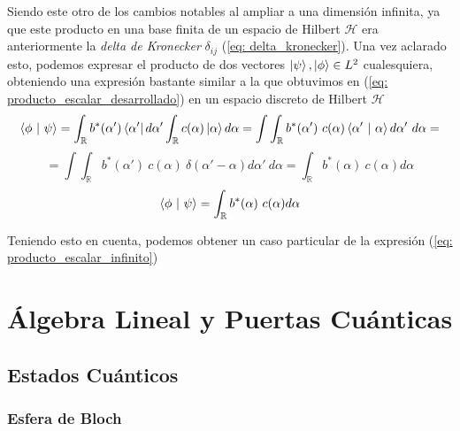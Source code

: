 \documentclass{article}
\numberwithin{equation}{section} %
\begin{document}
    \vspace{2.5mm}

    Siendo este otro de los cambios notables al ampliar a una dimensión infinita, ya que este producto en una base finita de un espacio de Hilbert \( \mathcal{H} \) era anteriormente la \textit{delta de Kronecker} \( \delta_{ij} \) (\ref{eq: delta_kronecker}). Una vez aclarado esto, podemos expresar el producto de dos vectores \( \ket{\psi}, \ket{\phi} \in L^{2} \) cualesquiera, obteniendo una expresión bastante similar a la que obtuvimos en (\ref{eq: producto_escalar_desarrollado}) en un espacio discreto de Hilbert \( \mathcal{H} \)
    \begin{equation*}
        \braket{\phi \ | \ \psi} = \int_{\mathbb{R}} b^{*} (\alpha') \bra{\alpha'} d \alpha' \int_{\mathbb{R}} c (\alpha) \ket{\alpha} d \alpha = \int\int_{\mathbb{R}} b^{*} (\alpha') \ c (\alpha) \braket{\alpha' \ | \ \alpha} d \alpha' \ d \alpha =
    \end{equation*}
    \begin{equation*}
        = \int\int_{\mathbb{R}} b^{*} (\alpha') \ c (\alpha) \ \delta(\alpha' - \alpha) d \alpha' \ d \alpha = \int_{\mathbb{R}} b^{*} (\alpha) \ c (\alpha) d \alpha
    \end{equation*}
    \begin{equation}
        \braket{\phi \ | \ \psi} = \int_{\mathbb{R}} b^{*} (\alpha) \ c (\alpha) d \alpha
        \label{eq: producto_escalar_infinito}
    \end{equation}

    \vspace{2.5mm}

    Teniendo esto en cuenta, podemos obtener un caso particular de la expresión (\ref{eq: producto_escalar_infinito})
        


    



    
    
    
    

    \section{Álgebra Lineal y Puertas Cuánticas}
    \subsection{Estados Cuánticos}
    \subsubsection{Esfera de Bloch}    
\end{document}
